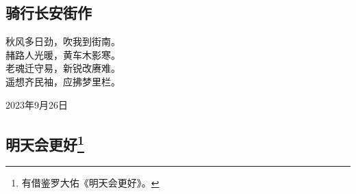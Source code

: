 \documentclass[a5paper]{ctexart}
\begin{document}
	
	
	\subsection{骑行长安街作}
	\begin{center}
		秋风多日劲，吹我到街南。\\
		赭路人光暖，黄车木影寒。\\
		老魂迁守易，新锐改赓难。\\
		遥想齐民袖，应拂梦里栏。
	\end{center}
	\begin{flushright}
		2023年9月26日
	\end{flushright}
	
	\subsection[明天会更好]{明天会更好\footnote{有借鉴罗大佑《明天会更好》。}}
\end{document}
